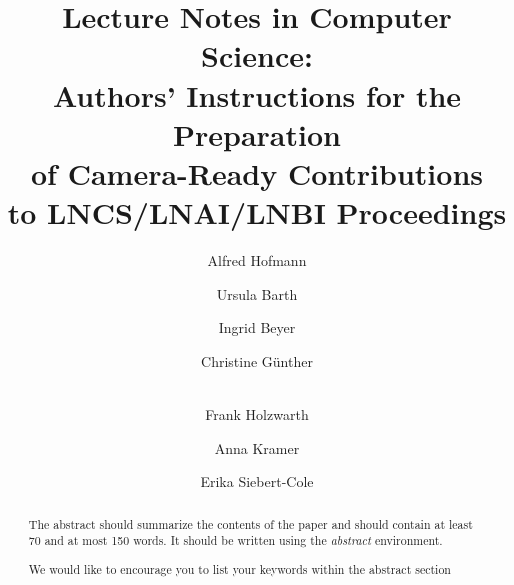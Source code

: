 \documentclass[runningheads]{llncs}
\newcommand{\keywords}[1]{\par\addvspace\baselineskip
\noindent\keywordname\enspace\ignorespaces#1}
\begin{document}
\mainmatter  %

\title{Lecture Notes in Computer Science:\\Authors' Instructions
for the Preparation\\of Camera-Ready
Contributions\\to LNCS/LNAI/LNBI Proceedings}


%
%
\author{Alfred Hofmann\and Ursula Barth\and Ingrid Beyer\and
Christine G\"{u}nther\and\\ Frank Holzwarth\and Anna Kramer\and Erika
Siebert-Cole}
%


%
%

\maketitle


\begin{abstract}
The abstract should summarize the contents of the paper and should
contain at least 70 and at most 150 words. It should be written using the
\emph{abstract} environment.
\keywords{We would like to encourage you to list your keywords within
the abstract section}
\end{abstract}
\end{document}

